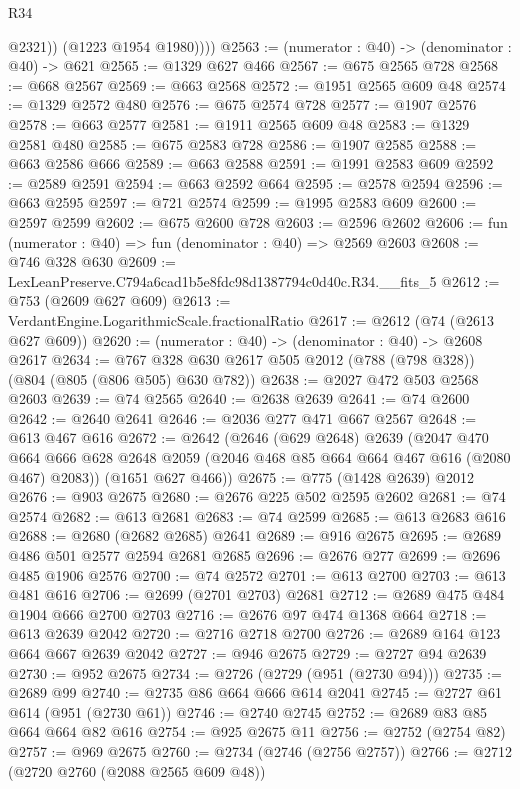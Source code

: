 \begin{lexlean}{R34}
\begin{coremodule}
              @2321))
          (@1223 @1954 @1980))))
@2563 := (numerator : @40) -> (denominator : @40) -> @621
@2565 := @1329 @627 @466
@2567 := @675 @2565 @728
@2568 := @668 @2567
@2569 := @663 @2568
@2572 := @1951 @2565 @609 @48
@2574 := @1329 @2572 @480
@2576 := @675 @2574 @728
@2577 := @1907 @2576
@2578 := @663 @2577
@2581 := @1911 @2565 @609 @48
@2583 := @1329 @2581 @480
@2585 := @675 @2583 @728
@2586 := @1907 @2585
@2588 := @663 @2586 @666
@2589 := @663 @2588
@2591 := @1991 @2583 @609
@2592 := @2589 @2591
@2594 := @663 @2592 @664
@2595 := @2578 @2594
@2596 := @663 @2595
@2597 := @721 @2574
@2599 := @1995 @2583 @609
@2600 := @2597 @2599
@2602 := @675 @2600 @728
@2603 := @2596 @2602
@2606 := fun (numerator : @40) => fun (denominator : @40) => @2569 @2603
@2608 := @746 @328 @630
@2609 := LexLeanPreserve.C794a6cad1b5e8fdc98d1387794c0d40c.R34.__fits_5
@2612 := @753 (@2609 @627 @609)
@2613 := VerdantEngine.LogarithmicScale.fractionalRatio
@2617 := @2612 (@74 (@2613 @627 @609))
@2620 := (numerator : @40) -> (denominator : @40) -> @2608 @2617
@2634 := @767 @328 @630 @2617 @505 @2012 (@788 (@798 @328)) (@804 (@805 (@806 @505) @630 @782))
@2638 := @2027 @472 @503 @2568 @2603
@2639 := @74 @2565
@2640 := @2638 @2639
@2641 := @74 @2600
@2642 := @2640 @2641
@2646 := @2036 @277 @471 @667 @2567
@2648 := @613 @467 @616
@2672 := @2642
    (@2646
      (@629 @2648)
      @2639
      (@2047
        @470
        @664
        @666
        @628
        @2648
        @2059
        (@2046 @468 @85 @664 @664 @467 @616 (@2080 @467) @2083))
      (@1651 @627 @466))
@2675 := @775 (@1428 @2639) @2012
@2676 := @903 @2675
@2680 := @2676 @225 @502 @2595 @2602
@2681 := @74 @2574
@2682 := @613 @2681
@2683 := @74 @2599
@2685 := @613 @2683 @616
@2688 := @2680 (@2682 @2685) @2641
@2689 := @916 @2675
@2695 := @2689 @486 @501 @2577 @2594 @2681 @2685
@2696 := @2676 @277
@2699 := @2696 @485 @1906 @2576
@2700 := @74 @2572
@2701 := @613 @2700
@2703 := @613 @481 @616
@2706 := @2699 (@2701 @2703) @2681
@2712 := @2689 @475 @484 @1904 @666 @2700 @2703
@2716 := @2676 @97 @474 @1368 @664
@2718 := @613 @2639 @2042
@2720 := @2716 @2718 @2700
@2726 := @2689 @164 @123 @664 @667 @2639 @2042
@2727 := @946 @2675
@2729 := @2727 @94 @2639
@2730 := @952 @2675
@2734 := @2726 (@2729 (@951 (@2730 @94)))
@2735 := @2689 @99
@2740 := @2735 @86 @664 @666 @614 @2041
@2745 := @2727 @61 @614 (@951 (@2730 @61))
@2746 := @2740 @2745
@2752 := @2689 @83 @85 @664 @664 @82 @616
@2754 := @925 @2675 @11
@2756 := @2752 (@2754 @82)
@2757 := @969 @2675
@2760 := @2734 (@2746 (@2756 @2757))
@2766 := @2712 (@2720 @2760 (@2088 @2565 @609 @48))

\end{coremodule}
\end{lexlean}
